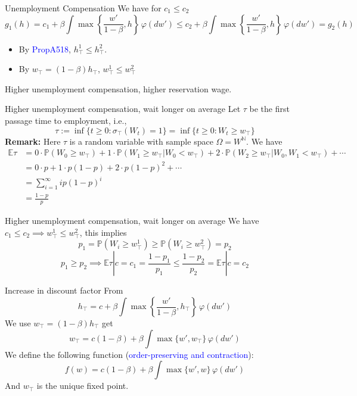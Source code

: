 \begin{frame}{Unemployment Compensation}
    We have for $c_1\le c_2$
    $$
    g_1(h) = c_1 + \beta \int \max\left\{\frac{w'}{1-\beta}, h\right\}\,\varphi(dw')\le c_2 + \beta \int \max\left\{\frac{w'}{1-\beta}, h\right\}\,\varphi(dw') = g_2(h)
    $$
\begin{itemize}
    \item By \textcolor{blue}{PropA518}, $h^1_\top \le h^2_\top$.
    \item By $w_\top = (1-\beta)h_\top$, $w^1_\top\le w^2_\top$
\end{itemize}
Higher unemployment compensation, higher reservation wage.
\end{frame}

\begin{frame}{Higher unemployment compensation, wait longer on average}
Let $\tau$ be the first passage time to employment, i.e.,
$$
\tau:= \inf\{t\ge 0: \sigma_\top (W_t) = 1\} = \inf\{t\ge 0: W_t\ge w_\top\}
$$
\textbf{Remark:} Here $\tau$ is a random variable with sample space $\Omega = W^\mathbb{N}$. We have
\begin{align*}
    \mathbb{E}\tau  &= 0\cdot \mathbb{P}(W_0\ge w_\top) + 1\cdot \mathbb{P}(W_1\ge w_\top
    |W_0< w_\top)+ 2\cdot \mathbb{P}(W_2\ge w_\top|W_0,W_1<w_\top)+\cdots\\
    &= 0\cdot p + 1\cdot p(1-p) + 2\cdot p(1-p)^2 + \cdots\\
    &= \sum_{i=1}^\infty ip(1-p)^i\tag{mean of Geometric distribution}\\
    &=\frac{1-p}{p}
\end{align*}
\end{frame}

\begin{frame}{Higher unemployment compensation, wait longer on average}
    We have $c_1\le c_2\implies w_\top^1\le w_\top^2$, this implies
    $$
    p_1 = \mathbb{P}(W_i\ge w^1_\top)\ge \mathbb{P}(W_i\ge w_\top^2) = p_2
    $$
    $$
    p_1\ge p_2\implies\mathbb{E}\tau|c=c_1 = \frac{1-p_1}{p_1} \le  \frac{1-p_2}{p_2} = \mathbb{E}\tau|c=c_2
    $$
\end{frame}

\begin{frame}{Increase in discount factor}
From 
$$
h_\top = c+\beta\int\max\left\{\frac{w'}{1-\beta}, h_\top\right\}\, \varphi(dw')
$$
We use $w_\top = (1-\beta)h_\top$ get
$$
w_\top  = c(1-\beta)  + \beta\int\max\{w', w_\top\}\,\varphi(dw')
$$
We define the following function (\textcolor{blue}{order-preserving and contraction}):
$$
f(w) =  c(1-\beta)  + \beta\int\max\{w', w\}\,\varphi(dw')
$$
And $w_\top$ is the unique fixed point. 
\end{frame}

